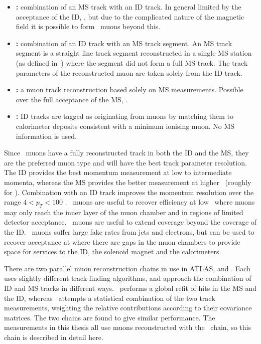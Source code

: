 \begin{itemize}

    \item {\bf \combined:} combination of an MS track with an ID track. In
    general limited by the acceptance of the ID, , but due to the complicated
    nature of the magnetic field it is possible to form \combined\ muons beyond
    this.

    \item {\bf \segmentTagged:} combination of an ID track with an MS track
    segment. An MS track segment is a straight line track segment reconstructed
    in a single MS station (as defined in~) where the segment did not form a full MS track. The
    track parameters of the reconstructed muon are taken solely from the ID
    track.

    \item {\bf \standAlone:} a muon track reconstruction based solely on 
    MS measurements. Possible over the full acceptance of the MS,
    .

    \item {\bf \calorimeterTagged:} ID tracks are tagged as originating from
    muons by matching them to calorimeter deposits consistent with a minimum ionising
    muon. No MS information is used.


\end{itemize}

Since \combined\ muons have a fully reconstructed track in both the ID and the
MS, they are the preferred muon type and will have the best track parameter
resolution. The ID provides the best momentum measurement at low to intermediate
momenta, whereas the MS provides the better measurement at higher \pt\ (roughly
for ). Combination with an ID track improves the momentum resolution
over the range $4 < p_{T} < 100$ \GeV. \segmentTagged\ muons are useful to recover
efficiency at low \pt\ where muons may only reach the inner layer of the muon
chamber and in regions of limited detector acceptance. \standAlone\ muons are
useful to extend coverage beyond the coverage of the ID. \caloTagged\
muons suffer large fake rates from jets and electrons, but can be used to
recover acceptance at \modetalt{0.1} where there are gaps in the muon chambers
to provide space for services to the ID, the solenoid magnet and the
calorimeters.

There are two parallel muon reconstruction chains in use in ATLAS,
\staco\cite{1742-6596-219-3-032052} and
\muid. Each uses slightly different track finding algorithms, and approach the
combination of ID and MS tracks in different ways. \muid\ performs a global
refit of hits in the MS and the ID, whereas \staco\ attempts a statistical
combination of the two track measurements, weighting the relative contributions
according to their covariance matrices. The two chains are found to give similar
performance. The measurements in this thesis all use muons
reconstructed with the \staco\ chain, so this chain is described in detail here.

